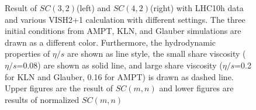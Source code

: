 \begin{figure}[!p]
\begin{center}
        \caption{Result of  $SC(3,2)$(left) and $SC(4,2)$(right) with LHC10h data and various VISH2+1 calculation with different settings. The three initial conditions from AMPT, KLN, and Glauber simulations are drawn as a different color. Furthermore, the hydrodynamic properties of $\eta/s$ are shown as line style, the small share viscosity ($\eta/s$=0.08) are shown as solid line, and large share viscosity ($\eta/s$=0.2 for KLN and Glauber, 0.16 for AMPT) is drawn as dashed line. Upper figures are the result of $SC(m,n)$ and lower figures are results of normalized $SC(m,n)$}
        \label{vish21}
        \end{center}   
     \end{figure}


